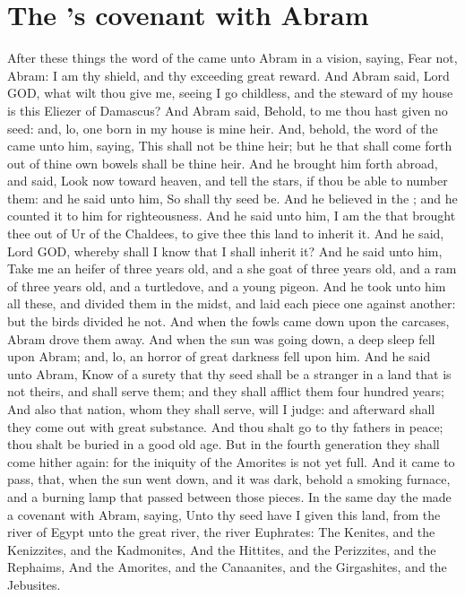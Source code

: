 \section*{The \LORD's covenant with Abram}
\begin{biblechapter} %
\verse After these things the word of the \LORD came unto Abram in a vision, saying, Fear not, Abram: I am thy shield, and thy exceeding great reward.
\verse And Abram said, Lord GOD, what wilt thou give me, seeing I go childless, and the steward of my house is this Eliezer of Damascus?
\verse And Abram said, Behold, to me thou hast given no seed: and, lo, one born in my house is mine heir.
\verse And, behold, the word of the \LORD came unto him, saying, This shall not be thine heir; but he that shall come forth out of thine own bowels shall be thine heir.
\verse And he brought him forth abroad, and said, Look now toward heaven, and tell the stars, if thou be able to number them: and he said unto him, So shall thy seed be.
\verse And he believed in the \LORD; and he counted it to him for righteousness.
\verse And he said unto him, I am the \LORD that brought thee out of Ur of the Chaldees, to give thee this land to inherit it.
\verse And he said, Lord GOD, whereby shall I know that I shall inherit it?
\verse And he said unto him, Take me an heifer of three years old, and a she goat of three years old, and a ram of three years old, and a turtledove, and a young pigeon.
\verse And he took unto him all these, and divided them in the midst, and laid each piece one against another: but the birds divided he not.
\verse And when the fowls came down upon the carcases, Abram drove them away.
\verse And when the sun was going down, a deep sleep fell upon Abram; and, lo, an horror of great darkness fell upon him.
\verse And he said unto Abram, Know of a surety that thy seed shall be a stranger in a land that is not theirs, and shall serve them; and they shall afflict them four hundred years;
\verse And also that nation, whom they shall serve, will I judge: and afterward shall they come out with great substance.
\verse And thou shalt go to thy fathers in peace; thou shalt be buried in a good old age.
\verse But in the fourth generation they shall come hither again: for the iniquity of the Amorites is not yet full.
\verse And it came to pass, that, when the sun went down, and it was dark, behold a smoking furnace, and a burning lamp that passed between those pieces.
\verse In the same day the \LORD made a covenant with Abram, saying, Unto thy seed have I given this land, from the river of Egypt unto the great river, the river Euphrates:
\verse The Kenites, and the Kenizzites, and the Kadmonites,
\verse And the Hittites, and the Perizzites, and the Rephaims,
\verse And the Amorites, and the Canaanites, and the Girgashites, and the Jebusites.
\end{biblechapter}

